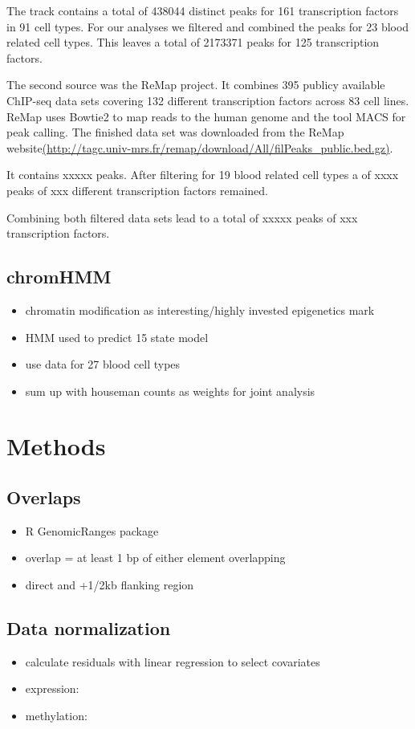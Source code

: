 \documentclass[a4paper,12pt]{article}
\begin{document}
The track contains a total of 438044 distinct peaks for 161 transcription factors in 91 cell types. For our analyses we filtered and combined the peaks for 23 blood related cell types. This leaves a total of 2173371 peaks for 125 transcription factors.  

The second source was the ReMap project\cite{doi:10.1093/nar/gku1280}. It combines 395 publicy available ChIP-seq data sets covering 132 different transcription factors across 83 cell lines. ReMap uses Bowtie2\cite{} to map reads to the human genome and the tool MACS\cite{} for peak calling. The finished data set was downloaded from the ReMap website\url{(http://tagc.univ-mrs.fr/remap/download/All/filPeaks_public.bed.gz)}.

It contains xxxxx peaks. After filtering for 19 blood related cell types a of xxxx peaks of xxx different transcription factors remained. 

Combining both filtered data sets lead to a total of xxxxx peaks of xxx transcription factors.


\subsection{chromHMM}
\begin{itemize}
\item chromatin modification as interesting/highly invested epigenetics mark
\item HMM used to predict 15 state model
\item use data for 27 blood cell types
\item sum up with houseman counts as weights for joint analysis
\end{itemize}

\section{Methods}
\subsection{Overlaps}
\begin{itemize}
\item R GenomicRanges package
\item overlap = at least 1 bp of either element overlapping
\item direct and +1/2kb flanking region
\end{itemize}
\subsection{Data normalization}
\begin{itemize}
\item calculate residuals with linear regression to select covariates
\item expression: 
\item methylation:
\end{itemize}
\end{document}
